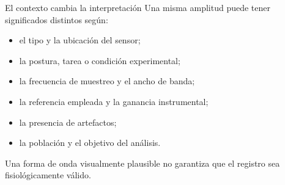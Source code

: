 \documentclass[
  ignorenonframetext,
  aspectratio=169,
  spanish,
  professionalfonts]{beamer}
\providecommand{\tightlist}{%
  \setlength{\itemsep}{0pt}\setlength{\parskip}{0pt}}
\begin{document}
\begin{frame}{El contexto cambia la interpretación}
\protect{}\label{el-contexto-cambia-la-interpretaciuxf3n}
Una misma amplitud puede tener significados distintos según:

\begin{itemize}
\tightlist
\item
  el tipo y la ubicación del sensor;
\item
  la postura, tarea o condición experimental;
\item
  la frecuencia de muestreo y el ancho de banda;
\item
  la referencia empleada y la ganancia instrumental;
\item
  la presencia de artefactos;
\item
  la población y el objetivo del análisis.
\end{itemize}

\begin{tcolorbox}[enhanced jigsaw, arc=.35mm, bottomrule=.15mm, bottomtitle=1mm, breakable, colback=white, colbacktitle=quarto-callout-caution-color!10!white, colframe=quarto-callout-caution-color-frame, coltitle=black, left=2mm, leftrule=.75mm, opacityback=0, opacitybacktitle=0.6, rightrule=.15mm, title={Criterio crítico}, titlerule=0mm, toprule=.15mm, toptitle=1mm]

Una forma de onda visualmente plausible no garantiza que el registro sea
fisiológicamente válido.

\end{tcolorbox}
\end{frame}
\end{document}
